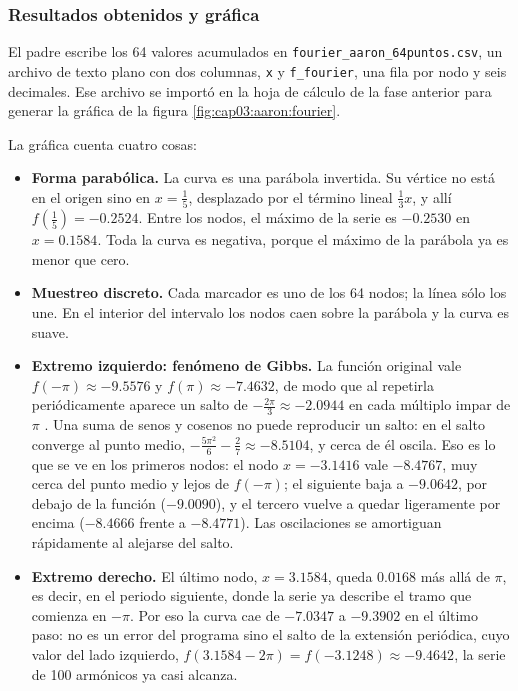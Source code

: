 \subsubsection{Resultados obtenidos y gráfica}
\label{sec:cap03:aaron:resultados}

El padre escribe los 64 valores acumulados en \texttt{fourier\_aaron\_64puntos.csv}, un archivo de texto plano con dos columnas, \texttt{x} y \texttt{f\_fourier}, una fila por nodo y seis decimales. Ese archivo se importó en la hoja de cálculo de la fase anterior para generar la gráfica de la figura \ref{fig:cap03:aaron:fourier}.


La gráfica cuenta cuatro cosas:

\begin{itemize}
    \item \textbf{Forma parabólica.} La curva es una parábola invertida. Su vértice no está en el origen sino en $x = \frac{1}{5}$, desplazado por el término lineal $\frac{1}{3}x$, y allí $f\left(\frac{1}{5}\right) = -0.2524$. Entre los nodos, el máximo de la serie es $-0.2530$ en $x = 0.1584$. Toda la curva es negativa, porque el máximo de la parábola ya es menor que cero.
    \item \textbf{Muestreo discreto.} Cada marcador es uno de los 64 nodos; la línea sólo los une. En el interior del intervalo los nodos caen sobre la parábola y la curva es suave.
    \item \textbf{Extremo izquierdo: fenómeno de Gibbs.} La función original vale $f(-\pi) \approx -9.5576$ y $f(\pi) \approx -7.4632$, de modo que al repetirla periódicamente aparece un salto de $-\frac{2\pi}{3} \approx -2.0944$ en cada múltiplo impar de $\pi$ \cite{kreyszig:matematicas-avanzadas:2011}. Una suma de senos y cosenos no puede reproducir un salto: en el salto converge al punto medio, $-\frac{5\pi^{2}}{6} - \frac{2}{7} \approx -8.5104$, y cerca de él oscila. Eso es lo que se ve en los primeros nodos: el nodo $x = -3.1416$ vale $-8.4767$, muy cerca del punto medio y lejos de $f(-\pi)$; el siguiente baja a $-9.0642$, por debajo de la función ($-9.0090$), y el tercero vuelve a quedar ligeramente por encima ($-8.4666$ frente a $-8.4771$). Las oscilaciones se amortiguan rápidamente al alejarse del salto.
    \item \textbf{Extremo derecho.} El último nodo, $x = 3.1584$, queda $0.0168$ más allá de $\pi$, es decir, en el periodo siguiente, donde la serie ya describe el tramo que comienza en $-\pi$. Por eso la curva cae de $-7.0347$ a $-9.3902$ en el último paso: no es un error del programa sino el salto de la extensión periódica, cuyo valor del lado izquierdo, $f(3.1584 - 2\pi) = f(-3.1248) \approx -9.4642$, la serie de 100 armónicos ya casi alcanza.
\end{itemize}

